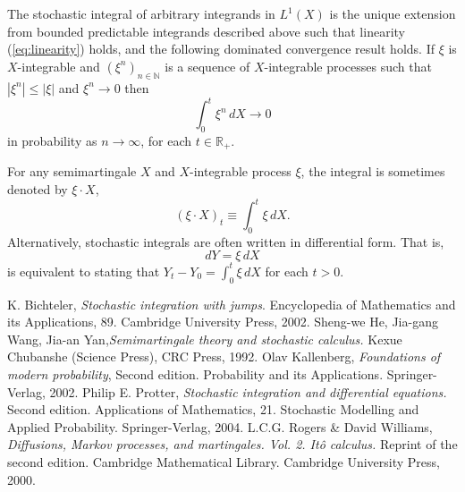 \documentclass[12pt]{article}
\begin{document}
The stochastic integral of arbitrary integrands in $L^1(X)$ is the unique extension from bounded predictable integrands described above such that linearity (\ref{eq:linearity}) holds, and the following dominated convergence result holds. If $\xi$ is $X$-integrable and $(\xi^n)_{n\in\mathbb{N}}$ is a sequence of $X$-integrable processes such that $|\xi^n|\le|\xi|$ and $\xi^n\rightarrow 0$ then
\begin{equation*}
\int_0^t\xi^n\,dX\rightarrow 0
\end{equation*}
in probability as $n\rightarrow\infty$, for each $t\in\mathbb{R}_+$.

For any semimartingale $X$ and $X$-integrable process $\xi$, the integral is sometimes denoted by $\xi\cdot X$,
\begin{equation*}
(\xi\cdot X)_t\equiv\int_0^t\xi\,dX.
\end{equation*}
Alternatively, stochastic integrals are often written in differential form. That is,
\begin{equation*}
dY=\xi\,dX
\end{equation*}
is equivalent to stating that $Y_t-Y_0=\int_0^t\xi\,dX$ for each $t>0$.


\begin{thebibliography}{9}
K. Bichteler, \emph{Stochastic integration with jumps}. Encyclopedia of Mathematics and its Applications, 89. Cambridge University Press, 2002.
Sheng-we He, Jia-gang Wang, Jia-an Yan,\emph{Semimartingale theory and stochastic calculus.} Kexue Chubanshe (Science Press), CRC Press, 1992.
Olav Kallenberg, \emph{Foundations of modern probability}, Second edition. Probability and its Applications. Springer-Verlag, 2002.
Philip E. Protter, \emph{Stochastic integration and differential equations.} Second edition. Applications of Mathematics, 21. Stochastic Modelling and Applied Probability. Springer-Verlag, 2004.
L.C.G. Rogers \& David Williams, \emph{Diffusions, Markov processes, and martingales. Vol. 2. It\^o calculus.} Reprint of the second edition. Cambridge Mathematical Library. Cambridge University Press, 2000.
\end{thebibliography}

\end{document}
